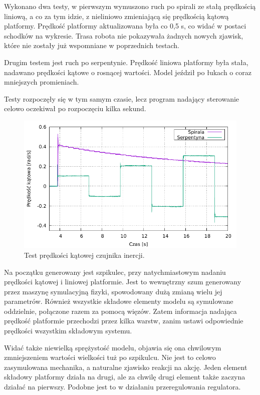 		Wykonano dwa testy, w pierwszym wymuszono ruch po spirali ze stałą prędkością liniową, a co za tym idzie, z nieliniowo zmieniającą się prędkością kątową platformy.
		Prędkość platformy aktualizowana była co 0,5 s, co widać w postaci schodków na wykresie.
		Trasa robota nie pokazywała żadnych nowych zjawisk, które nie zostały już wspomniane w poprzednich testach.
		
		Drugim testem jest ruch po serpentynie.
		Prędkość liniowa platformy była stała, nadawano prędkości kątowe o rosnącej wartości. Model jeździł po łukach o coraz mniejszych promieniach.
		
		Testy rozpoczęły się w tym samym czasie, lecz program nadający sterowanie celowo oczekiwał po rozpoczęciu kilka sekund.
		
		\begin{figure}[H]
		\centering
			\includegraphics[width=\textwidth]{plots/wewucho_angular.pdf}
			\caption{Test prędkości kątowej czujnika inercji.}
			\label{plot:wewucho_angular}
		\end{figure}
		

		Na początku generowany jest szpikulec, przy natychmiastowym nadaniu prędkości kątowej i liniowej platformie.
		Jest to wewnętrzny szum generowany przez maszynę symulacyjną fizyki, spowodowany dużą zmianą wielu jej parametrów.
		Również wszystkie składowe elementy modelu są symulowane oddzielnie, połączone razem za pomocą więzów.
		Zatem informacja nadająca prędkość platformie przechodzi przez kilka warstw, zanim ustawi odpowiednie prędkości wszystkim składowym systemu.
		
		Widać także niewielką sprężystość modelu, objawia się ona chwilowym zmniejszeniem wartości wielkości tuż po szpikulcu.
		Nie jest to celowo zasymulowana mechanika, a naturalne zjawisko reakcji na akcję. Jeden element składowy platformy działa na drugi, ale za chwilę drugi element także
		zaczyna działać na pierwszy. Podobne jest to w działaniu przeregulowania regulatora.
		
